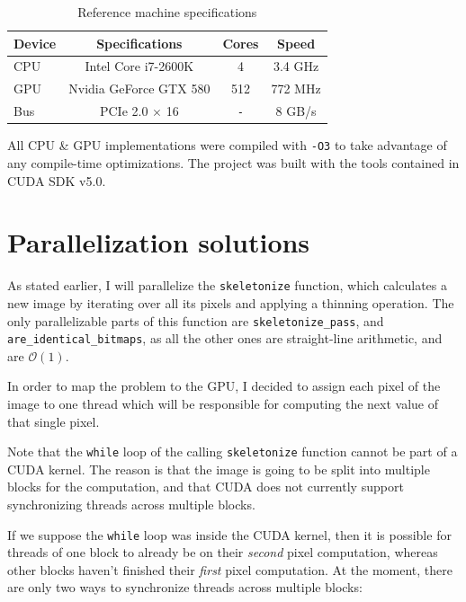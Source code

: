 \documentclass[11pt,a4paper]{article}
\begin{document}
            \begin{table}[h]
            \centering
                \begin{tabular}{lccc}
                    \toprule
                    Device & Specifications         & Cores    & Speed   \\
                    \midrule
                    CPU    & Intel Core i7-2600K    & 4        & 3.4 GHz \\
                    GPU    & Nvidia GeForce GTX 580 & 512      & 772 MHz \\
                    Bus    & PCIe 2.0 $\times$ 16   & \verb+-+ & 8 GB/s  \\
                    \bottomrule
                \end{tabular}
                \caption{Reference machine specifications}
                    \label{tab:reference_machine_specifications}
            \end{table}

            All CPU \& GPU implementations were compiled with \verb|-O3| to take advantage of any compile-time optimizations.
            The project was built with the tools contained in CUDA SDK v5.0.

    \section{Parallelization solutions}
        As stated earlier, I will parallelize the \verb+skeletonize+ function, which calculates a new image by iterating over all its pixels and applying a thinning operation.
        The only parallelizable parts of this function are \verb+skeletonize_pass+, and \verb+are_identical_bitmaps+, as all the other ones are straight-line arithmetic, and are $\mathcal{O}(1)$.

        In order to map the problem to the GPU, I decided to assign each pixel of the image to one thread which will be responsible for computing the next value of that single pixel.

        Note that the \verb+while+ loop of the calling \verb+skeletonize+ function cannot be part of a CUDA kernel.
        The reason is that the image is going to be split into multiple blocks for the computation, and that CUDA does not currently support synchronizing threads across multiple blocks.

        If we suppose the \verb+while+ loop was inside the CUDA kernel, then it is possible for threads of one block to already be on their \emph{second} pixel computation, whereas other blocks haven't finished their \emph{first} pixel computation.
        At the moment, there are only two ways to synchronize threads across multiple blocks:
\end{document}
